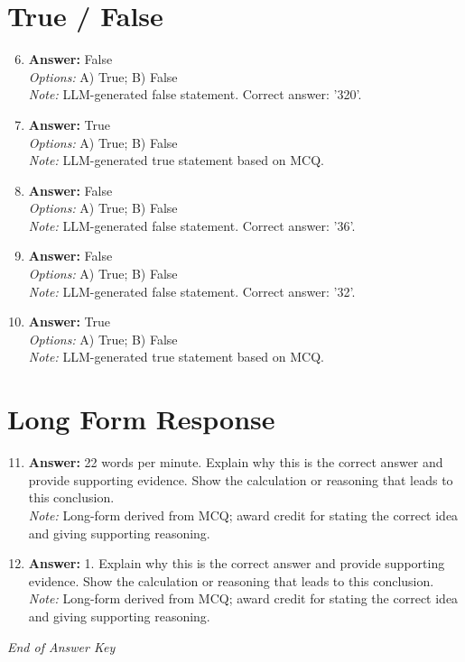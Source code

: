 \documentclass[12pt]{article}
\begin{document}
\section*{True / False}
\begin{enumerate}[label=\arabic*.]
\setcounter{enumi}{5}
\item \textbf{Answer:} False
\\ \textit{Options:} A) True; B) False
\\ \textit{Note:} LLM-generated false statement. Correct answer: '320'.
\item \textbf{Answer:} True
\\ \textit{Options:} A) True; B) False
\\ \textit{Note:} LLM-generated true statement based on MCQ.
\item \textbf{Answer:} False
\\ \textit{Options:} A) True; B) False
\\ \textit{Note:} LLM-generated false statement. Correct answer: '36'.
\item \textbf{Answer:} False
\\ \textit{Options:} A) True; B) False
\\ \textit{Note:} LLM-generated false statement. Correct answer: '32'.
\item \textbf{Answer:} True
\\ \textit{Options:} A) True; B) False
\\ \textit{Note:} LLM-generated true statement based on MCQ.
\end{enumerate}

\section*{Long Form Response}
\begin{enumerate}[label=\arabic*.]
\setcounter{enumi}{10}
\item \textbf{Answer:} 22 words per minute. Explain why this is the correct answer and provide supporting evidence. Show the calculation or reasoning that leads to this conclusion.
\\ \textit{Note:} Long-form derived from MCQ; award credit for stating the correct idea and giving supporting reasoning.
\item \textbf{Answer:} 1. Explain why this is the correct answer and provide supporting evidence. Show the calculation or reasoning that leads to this conclusion.
\\ \textit{Note:} Long-form derived from MCQ; award credit for stating the correct idea and giving supporting reasoning.
\end{enumerate}

\vfill
\noindent\textit{End of Answer Key}
\end{document}
